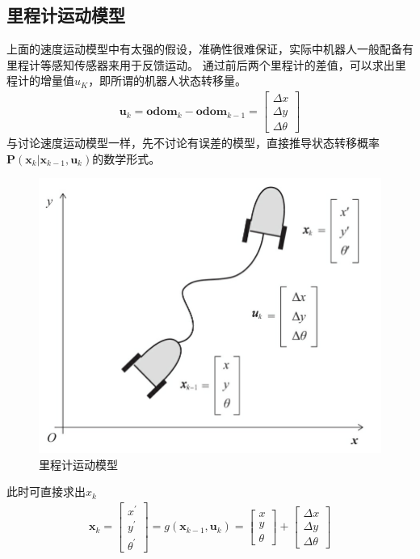 \documentclass[10pt]{article}
\begin{document}
\subsection{里程计运动模型}
上面的速度运动模型中有太强的假设，准确性很难保证，实际中机器人一般配备有里程计等感知传感器来用于反馈运动。
通过前后两个里程计的差值，可以求出里程计的增量值$u_{K}$，即所谓的机器人状态转移量。
\begin{align}  
    \mathbf{u}_{k}=\textbf{odom}_k - \textbf{odom}_{k-1}=
    \left[\begin{array}{c}\Delta x \\ \Delta y \\ \Delta \theta\end{array}\right] 
\end{align}
与讨论速度运动模型一样，先不讨论有误差的模型，直接推导状态转移概率$\mathbf{P}(\mathbf{x}_k|
\mathbf{x}_{k-1},\mathbf{u}_k)$的数学形式。
\begin{figure}[!htb]
    \includegraphics[width=\hsize]{images/里程计运动模型.png}
    \caption{里程计运动模型} 
\end{figure}    
此时可直接求出$x_k$
\begin{align}  
    \mathbf{x}_{k}=\left[\begin{array}{c}x^{'} \\ y^{'} \\ \theta^{'}\end{array}\right]
    =g(\mathbf{x}_{k-1},\mathbf{u}_{k})=\left[\begin{array}{c}x \\ y \\ \theta \end{array}\right] 
    +\left[\begin{array}{c}\Delta x \\ \Delta y \\ \Delta \theta \end{array}\right]
\end{align}
\end{document}
